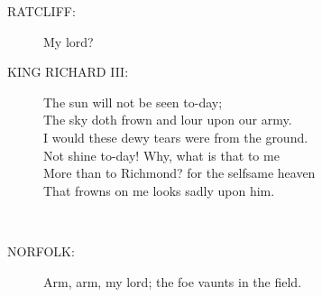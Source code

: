 \documentclass{article}
\begin{document}
\begin{description}
\item[RATCLIFF:] 
\hspace{1pt}My lord?\\
\end{description}
\begin{description}
\item[KING RICHARD III:] 
\hspace{1pt}The sun will not be seen to-day;\\
\hspace{1pt}The sky doth frown and lour upon our army.\\
\hspace{1pt}I would these dewy tears were from the ground.\\
\hspace{1pt}Not shine to-day! Why, what is that to me\\
\hspace{1pt}More than to Richmond?  for the selfsame heaven\\
\hspace{1pt}That frowns on me looks sadly upon him.\\
\end{description}
\\
\begin{description}
\item[NORFOLK:] 
\hspace{1pt}Arm, arm, my lord; the foe vaunts in the field.\\
\end{description}
\end{document}
